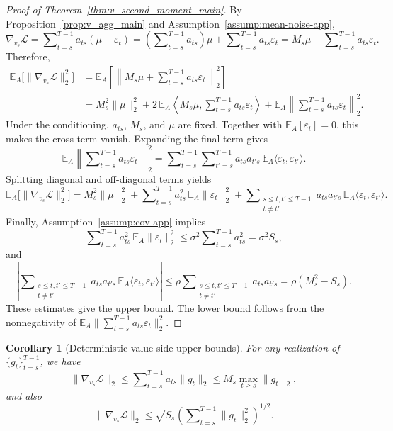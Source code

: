 \documentclass{article}
\theoremstyle{plain}
\newtheorem{corollary}{Corollary}
\theoremstyle{definition}
\theoremstyle{remark}
\begin{document}
\begin{proof}[Proof of Theorem~\ref{thm:v_second_moment_main}]
By Proposition~\ref{prop:v_agg_main} and Assumption~\ref{assump:mean-noise-app},
\[
    \nabla_{v_s} \mathcal{L} = \sum\nolimits_{t=s}^{T-1} a_{ts}(\mu + \varepsilon_t) = \left(\sum\nolimits_{t=s}^{T-1} a_{ts}\right)\mu + \sum\nolimits_{t=s}^{T-1} a_{ts}\varepsilon_t = M_s \mu + \sum\nolimits_{t=s}^{T-1} a_{ts}\varepsilon_t.
\]
Therefore,
\[\begin{aligned}
    \mathbb{E}_A\bigl[\|\nabla_{v_s} \mathcal{L}\|_2^2\bigr]
    &= \mathbb{E}_A\left[\left\|M_s\mu + \sum\nolimits_{t=s}^{T-1} a_{ts}\varepsilon_t\right\|_2^2\right] \\
    &= M_s^2\|\mu\|_2^2 + 2\,\mathbb{E}_A\left\langle M_s\mu, \sum\nolimits_{t=s}^{T-1} a_{ts}\varepsilon_t \right\rangle + \mathbb{E}_A\left\|\sum\nolimits_{t=s}^{T-1} a_{ts}\varepsilon_t\right\|_2^2.
\end{aligned}\]
Under the conditioning, $a_{ts}$, $M_s$, and $\mu$ are fixed. Together with $\mathbb{E}_A[\varepsilon_t]=0$, this makes the cross term vanish. Expanding the final term gives
\[
    \mathbb{E}_A\left\|\sum\nolimits_{t=s}^{T-1} a_{ts}\varepsilon_t\right\|_2^2
    = \sum\nolimits_{t=s}^{T-1}\sum\nolimits_{t'=s}^{T-1} a_{ts} a_{t's} \, \mathbb{E}_A\langle \varepsilon_t, \varepsilon_{t'} \rangle.
\]
Splitting diagonal and off-diagonal terms yields
\[
\mathbb{E}_A\big[\|\nabla_{v_s}\mathcal{L}\|_2^2\big]
=
M_s^2\|\mu\|_2^2
+
\sum\nolimits_{t=s}^{T-1} a_{ts}^2 \, \mathbb{E}_A \|\varepsilon_t\|_2^2
+
\sum\nolimits_{\substack{s\le t,t'\le T-1 \\ t\ne t'}} a_{ts} a_{t's} \, \mathbb{E}_A\langle \varepsilon_t, \varepsilon_{t'} \rangle.
\]
Finally, Assumption~\ref{assump:cov-app} implies
\[
    \sum\nolimits_{t=s}^{T-1} a_{ts}^2 \, \mathbb{E}_A \|\varepsilon_t\|_2^2 \le \sigma^2 \sum\nolimits_{t=s}^{T-1} a_{ts}^2 = \sigma^2 S_s,
\]
and
\[
    \left|\sum\nolimits_{\substack{s\le t,t'\le T-1 \\ t\neq t'}} a_{ts} a_{t's} \, \mathbb{E}_A\langle \varepsilon_t, \varepsilon_{t'} \rangle \right|
    \le \rho \sum\nolimits_{\substack{s\le t,t'\le T-1 \\ t\neq t'}} a_{ts} a_{t's}
    = \rho(M_s^2 - S_s).
\]
These estimates give the upper bound. The lower bound follows from the nonnegativity of $\mathbb{E}_A\|\sum_{t=s}^{T-1}a_{ts}\varepsilon_t\|_2^2$.
\end{proof}

\begin{corollary}[Deterministic value-side upper bounds]\label{cor:v-deterministic-app}
For any realization of $\{g_t\}_{t=s}^{T-1}$, we have
\[
    \|\nabla_{v_s} \mathcal{L}\|_2 \le \sum\nolimits_{t=s}^{T-1} a_{ts}\|g_t\|_2 \le M_s \max_{t\ge s} \|g_t\|_2,
\]
and also
\[
    \|\nabla_{v_s} \mathcal{L}\|_2 \le \sqrt{S_s} \left(\sum\nolimits_{t=s}^{T-1} \|g_t\|_2^2\right)^{1/2}.
\]
\end{corollary}
\end{document}
